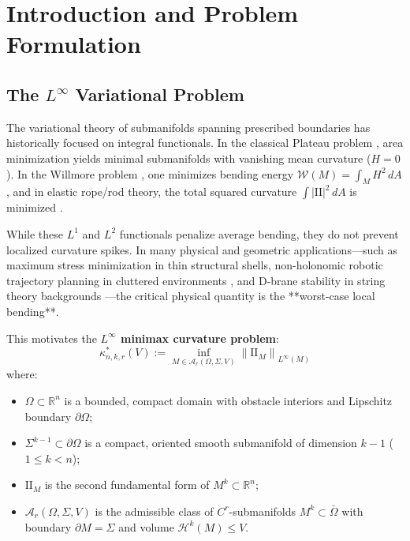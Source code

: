 \documentclass[11pt,reqno]{amsart}
\theoremstyle{definition}
\providecommand{\R}{\mathbb{R}}
\providecommand{\II}{\mathrm{I\!I}}
\providecommand{\Hsn}{\mathcal{H}}
\numberwithin{equation}{section}
\providecommand{\II}{\mathrm{II}}
\providecommand{\R}{\mathbb{R}}
\providecommand{\Hsn}{\mathcal{H}}
\begin{document}
\maketitle

\tableofcontents
\newpage

\section{Introduction and Problem Formulation}

\subsection{The \texorpdfstring{$L^\infty$}{L\textasciicircum\textbackslash{}infty} Variational Problem}
The variational theory of submanifolds spanning prescribed boundaries has historically focused on integral functionals. In the classical Plateau problem \cite{douglas1931}, area minimization yields minimal submanifolds with vanishing mean curvature ($H = 0$). In the Willmore problem \cite{willmore1965, simon1993, riviere2008}, one minimizes bending energy $\mathcal{W}(M) = \int_M H^2 \, dA$, and in elastic rope/rod theory, the total squared curvature $\int |\II|^2 \, dA$ is minimized \cite{langer1984}.

While these $L^1$ and $L^2$ functionals penalize average bending, they do not prevent localized curvature spikes. In many physical and geometric applications---such as maximum stress minimization in thin structural shells, non-holonomic robotic trajectory planning in cluttered environments \cite{dubins1957, sussmann1995, chitsaz2007}, and D-brane stability in string theory backgrounds \cite{bachas1996, polchinski1998}---the critical physical quantity is the **worst-case local bending**.

This motivates the \textbf{$L^\infty$ minimax curvature problem}:
\begin{equation}
\label{eq:variational_problem}
\kappa^*_{n,k,r}(V) := \inf_{M \in \mathcal{A}_r(\Omega, \Sigma, V)} \left\| \II_M \right\|_{L^\infty(M)}
\end{equation}
where:
\begin{itemize}
    \item $\Omega \subset \R^n$ is a bounded, compact domain with obstacle interiors and Lipschitz boundary $\partial\Omega$;
    \item $\Sigma^{k-1} \subset \partial\Omega$ is a compact, oriented smooth submanifold of dimension $k-1$ ($1 \le k < n$);
    \item $\II_M$ is the second fundamental form of $M^k \subset \R^n$;
    \item $\mathcal{A}_r(\Omega, \Sigma, V)$ is the admissible class of $C^r$-submanifolds $M^k \subset \bar{\Omega}$ with boundary $\partial M = \Sigma$ and volume $\Hsn^k(M) \le V$.
\end{itemize}
\end{document}
